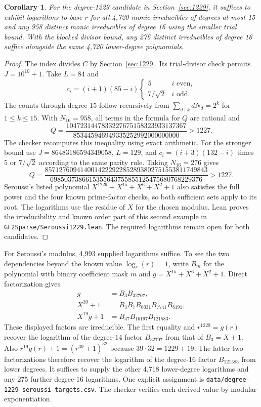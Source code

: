 \documentclass[11pt]{article}
\newtheorem{corollary}[theorem]{Corollary}
\begin{document}
\begin{corollary}\label{cor:1229-logs}
For the degree-1229 candidate in Section~\ref{sec:1229}, it suffices
to exhibit logarithms to base \(r\) for all 4,720 monic irreducibles
of degrees at most 15 and any 958 distinct monic irreducibles of
degree 16 using the smaller trial bound. With the blocked divisor
bound, any 276 distinct irreducibles of degree 16 suffice alongside
the same 4,720 lower-degree polynomials.
\end{corollary}
\begin{proof}
The index divides \(C\) by Section~\ref{sec:1229}. Its trial-divisor
check permits \(J=10^{10}+1\). Take \(L=84\) and
\[
 c_i=(i+1)(85-i)
 \begin{cases}5 & i\text{ even},\\ 7/\sqrt2 & i\text{ odd}.\end{cases}
\]
The counts through degree 15 follow recursively from
\(\sum_{d\mid k}dN_d=2^k\) for \(1\le k\le15\). With \(N_{16}=958\),
all terms in the formula for \(Q\) are rational and
\[
 Q=\frac{1047231447833227675158323933137367}{853445946949335252992000000000}
      >1227.
\]
The checker recomputes this inequality using exact arithmetic.
For the stronger bound use \(J=86483186594349058\), \(L=129\), and
\(c_i=(i+3)(132-i)\) times \(5\) or \(7/\sqrt2\) according to the same
parity rule. Taking \(N_{16}=276\) gives
\[
 Q=\frac{8571276094140014222922852893802751553811749843}
         {6985037386615355643755855125475680768229376}>1227.
\]
Seroussi's listed polynomial \(X^{1229}+X^{15}+X^6+X^2+1\) also
satisfies the full power and the four known prime-factor checks, so
both sufficient sets apply to its root. The logarithms use the residue
of \(X\) for the chosen modulus. Lean proves the irreducibility and
known order part of this second example in
\nolinkurl{GF2Sparse/Seroussi1229.lean}. The required logarithms
remain open for both candidates.
\end{proof}

For Seroussi's modulus, 4,993 supplied logarithms suffice. To see
the two dependencies beyond the known value \(\log_r(r)=1\), write
\(B_m\) for the polynomial with binary coefficient mask \(m\) and
\(g=X^{15}+X^6+X^2+1\). Direct factorization gives
\[
\begin{aligned}
 g&=B_3B_{32707},\\
 X^{39}+1&=B_3B_7B_{6031}B_{7741}B_{8191},\\
 X^{19}g+1&=B_{47}B_{16197}B_{121583}.
\end{aligned}
\]
These displayed factors are irreducible. The first equality and
\(r^{1229}=g(r)\) recover the logarithm of the degree-14 factor
\(B_{32707}\) from that of \(B_3=X+1\). Also
\(r^{19}g(r)+1=(r^{39}+1)^{32}\) because \(39\cdot32=1229+19\).
The latter two factorizations therefore recover the logarithm of
the degree-16 factor \(B_{121583}\) from lower degrees.
It suffices to supply the other 4,718 lower-degree logarithms and
any 275 further degree-16 logarithms. One explicit assignment is
\nolinkurl{data/degree-1229-seroussi-targets.csv}. The checker verifies each
derived value by modular exponentiation.
\end{document}
